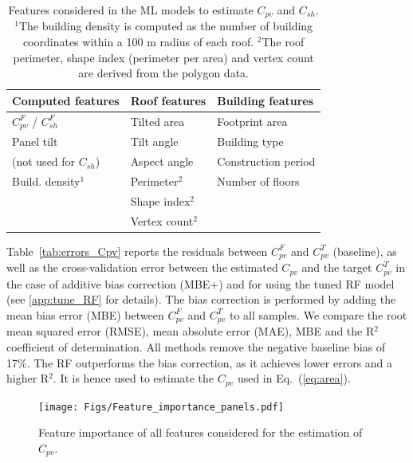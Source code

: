 \begin{table}[b]
\centering
\footnotesize
\caption{Features considered in the ML models to estimate $C_{\mathit{pv}}$ and $C_{sh}$. $^1$The building density is computed as the number of building coordinates within a 100 m radius of each roof. $^2$The roof perimeter, shape index (perimeter per area) and vertex count are derived from the polygon data.}
\label{tab:features}
\begin{tabular}{lll}
\hline
\textbf{Computed features}               & \textbf{Roof features} & \textbf{Building features} \\
\hline
$C_{\mathit{pv}}^F$ / $C_{sh}^F$ & Tilted area                          & Footprint area                              \\
Panel tilt   & Tilt angle                          & Building type                              \\
(not used for $C_{sh}$)      & Aspect angle                        & Construction period          \\
Build. density$^1$                    & Perimeter$^2$                       & Number of floors                             \\
                                 & Shape index$^2$                       &   \\
 & Vertex count$^2$ & \\ 
\hline                                
\end{tabular}
\end{table}

Table~\ref{tab:errors_Cpv} reports the residuals between $C_{\mathit{pv}}^F$ and $C_{\mathit{pv}}^T$ (baseline), as well as the cross-validation error between the estimated $C_{\mathit{pv}}$ and the target $C_{\mathit{pv}}^T$ in the case of additive bias correction (MBE+) and for using the tuned RF model (see \ref{app:tune_RF} for details).
The bias correction is performed by adding the mean bias error (MBE) between $C_{\mathit{pv}}^F$ and $C_{\mathit{pv}}^T$  to all samples. 
We compare the root mean squared error (RMSE), mean absolute error (MAE), MBE and the R$^2$ coefficient of determination. All methods remove the negative baseline bias of 17\%. The RF outperforms the bias correction, as it achieves lower errors and a higher R$^2$. It is hence used to estimate the $C_{\mathit{pv}}$ used in Eq.~(\ref{eq:area}).

\begin{figure}[tb]
\centering
  \texttt{[image: Figs/Feature\_importance\_panels.pdf]}
\caption{Feature importance of all features considered for the estimation of $C_{\mathit{pv}}$.
}
\label{fig:RF_Cpv}
\end{figure}


